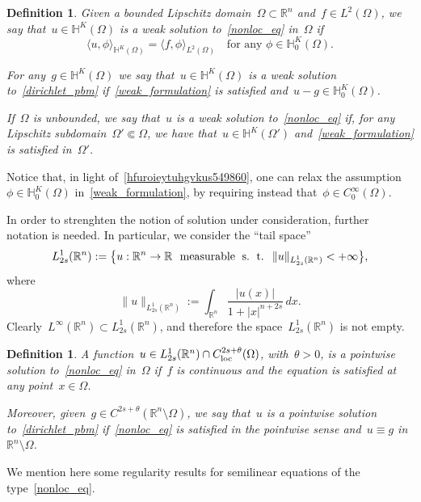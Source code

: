\documentclass[10pt,a4paper]{amsart}
\newtheorem{defn}[theorem]{Definition}
\numberwithin{equation}{section}
\newcommand{\Rn}{\mathbb{R}^n}
\newcommand{\R}{\mathbb{R}}
\newcommand{\snr}[1]{\lvert #1\rvert}
\newcommand{\Hbb}{\mathbb{H}^K}
\begin{document}
    \begin{defn}
    Given a bounded Lipschitz domain~$\Omega\subset\Rn$ and~$f \in L^2(\Omega)$, we say that~$u \in \Hbb(\Omega)$ is a weak solution to~\eqref{nonloc_eq} in~$\Omega$ if
    \begin{equation}\label{weak_formulation}
        \langle u, \phi \rangle_{\Hbb(\Omega)} = \langle f, \phi \rangle_{L^2(\Omega)} \quad\mbox{for any } \phi \in \Hbb_0(\Omega).
    \end{equation}
 
    For any~$g \in \Hbb(\Omega)$ we say that~$u \in \Hbb(\Omega)$ is a weak solution to~\eqref{dirichlet_pbm} if~\eqref{weak_formulation}
    is satisfied and~$u-g \in \Hbb_0(\Omega)$.

    If~$\Omega$ is unbounded, we say that~$u$ is a weak solution to~\eqref{nonloc_eq} if, for any Lipschitz subdomain~$\Omega' \Subset \Omega$, we have that~$u \in \Hbb(\Omega')$ and~\eqref{weak_formulation} is satisfied in~$\Omega'$.
    \end{defn}

Notice that, in light of~\eqref{hfuroieytuhgvkus549860}, one can
relax the assumption~$\phi \in \Hbb_0(\Omega)$ in~\eqref{weak_formulation}, by requiring instead that~$\phi \in C^\infty_0(\Omega)$.

    In order to strenghten the notion of solution under consideration, further notation is needed. In particular, we consider the ``tail space''
    $$
    L^1_{2s}(\Rn) := \big\{u : \Rn \to \R \ \ \mbox{measurable}\;{\mbox{ s. ~\!t. }}\; \|u\|_{L^1_{2s}(\Rn)}<+\infty\big\},
    $$
    where
    $$
    \|u\|_{L^1_{2s}(\Rn)}:= \int_{\Rn} \frac{\snr{u(x)}}{1+\snr{x}^{n+2s}}\,dx.
    $$ 
    Clearly~$L^\infty (\Rn) \subset L^1_{2s}(\Rn)$, and therefore the space~$L^1_{2s}(\Rn)$ is not empty. 
    
    \begin{defn}
     A function~$u \in L^1_{2s}(\Rn) \cap C^{2s+{\theta}}_{\rm loc}(\Omega)$, with~${\theta} >0$, is a pointwise solution to~\eqref{nonloc_eq} in~$\Omega$ if~$f$ is continuous and the equation is satisfied at any point~$x \in \Omega$. 

     Moreover, given~$g \in C^{2s+{\theta}}(\Rn\setminus\Omega)$, we say that~$u$ is a pointwise solution to~\eqref{dirichlet_pbm} if~\eqref{nonloc_eq} is satisfied in the pointwise sense and~$u\equiv g$ in~$\Rn \setminus \Omega$.
    \end{defn}
     
We mention here some regularity results for semilinear equations of the type~\eqref{nonloc_eq}.
\end{document}
